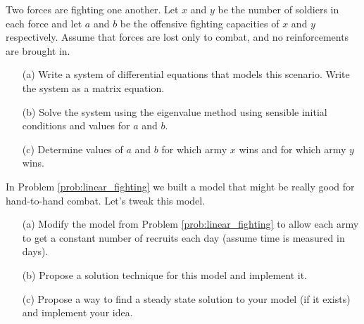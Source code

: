 \begin{problem}\label{prob:linear_fighting}
    Two forces are fighting one another. Let $x$ and $y$ be the number of soldiers in each
    force and let $a$ and $b$ be the offensive fighting capacities of $x$ and $y$ respectively.
    Assume that forces are lost only to combat, and no reinforcements are brought in.
    \begin{enumerate}
        \item[(a)] Write a system of differential equations that models this scenario.
            Write the system as a matrix equation.
        \item[(b)] Solve the system using the eigenvalue method using sensible initial
            conditions and values for $a$ and $b$.
        \item[(c)] Determine values of $a$ and $b$ for which army $x$ wins and for which
            army $y$ wins.
    \end{enumerate}
\end{problem}


\begin{problem}\label{prob:linear_fighting_nonhom}
    In Problem \ref{prob:linear_fighting} we built a model that might be really good for
    hand-to-hand combat.  Let's tweak this model.
    \begin{enumerate}
        \item[(a)] Modify the model from Problem \ref{prob:linear_fighting} to allow each
            army to get a constant number of recruits each day (assume time is measured in
            days).
        \item[(b)] Propose a solution technique for this model and implement it.
        \item[(c)] Propose a way to find a steady state solution to your model (if it
            exists) and implement your idea.
    \end{enumerate}
\end{problem}

%             

